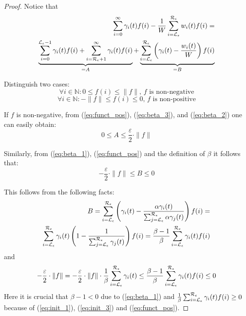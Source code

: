 \documentclass{entcs}
\begin{document}
{\begin{proof}
		Notice that
		\begin{eqnarray}
			\sum_{i=0}^{\infty} \gamma_{i}(t) f(i) - \frac{1}{W}\sum_{i = \mathcal{L}_{\epsilon}}^{\mathcal{R}_{\epsilon}} w_{i}(t) f(i) = \nonumber \\
			\underbrace{\sum_{i = 0}^{\mathcal{L}_{\epsilon}-1} \gamma_{i}(t) f(i) + \sum_{i = \mathcal{R}_{\epsilon}+1}^{\infty} \gamma_{i}(t) f(i)}_{ = A} +  
			\underbrace{\sum_{i = \mathcal{L}_{\epsilon}}^{\mathcal{R}_{\epsilon}} \left( \gamma_{i}(t) - \frac{w_{i}(t)}{W} \right) f(i)}_{ = B} \nonumber
		\end{eqnarray}
		
		Distinguish two cases:
		\begin{equation}
			\forall i \in \mathbb{N} : 0 \leq f(i) \leq \|f\| \text{, $f$ is non-negative} \label{eq:funct_pos}
		\end{equation}
		\begin{equation}
			\forall i \in \mathbb{N} : -\|f\| \leq f(i) \leq 0 \text{, $f$ is non-positive} \label{eq:funct_neg}
		\end{equation}
		
		If $f$ is non-negative, from (\ref{eq:funct_pos}), (\ref{eq:beta_3}), and (\ref{eq:beta_2}) one can easily obtain:
		\begin{equation}
			0 \leq A \leq \frac{\varepsilon}{2} \cdot \|f\|
			\label{eq:fg_A_pos}
		\end{equation}
		
		Similarly, from (\ref{eq:beta_1}), (\ref{eq:funct_pos}) and the definition of $\beta$ it follows that:
		\begin{equation}
			- \frac{\varepsilon}{2} \cdot \|f\| \leq B \leq 0
			\label{eq:fg_B_pos}
		\end{equation}
		
		This follows from the following facts:
		\begin{eqnarray}
			B = \sum_{i = \mathcal{L}_{\epsilon}}^{\mathcal{R}_{\epsilon}} \left( \gamma_{i}(t) - \frac{\alpha \gamma_{i}(t) }{\sum^{\mathcal{R}_{\epsilon}}_{j=\mathcal{L}_{\epsilon}} \alpha \gamma_{j}(t)} \right) f(i) = \nonumber \\
			\sum_{i = \mathcal{L}_{\epsilon}}^{\mathcal{R}_{\epsilon}} \gamma_{i}(t) \left( 1 - \frac{1}{\sum^{\mathcal{R}_{\epsilon}}_{j=\mathcal{L}_{\epsilon}} \gamma_{j}(t)} \right) f(i) = \frac{\beta - 1}{\beta} \sum_{i = \mathcal{L}_{\epsilon}}^{\mathcal{R}_{\epsilon}} \gamma_{i}(t)  f(i)\nonumber
		\end{eqnarray}
		and
		\[
			- \frac{\varepsilon}{2} \cdot \|f\| = - \frac{\varepsilon}{2} \cdot \|f\|\cdot \frac{1}{\beta} \sum_{i = \mathcal{L}_{\epsilon}}^{\mathcal{R}_{\epsilon}} \gamma_{i}(t) \leq \frac{\beta - 1}{\beta} \sum_{i = \mathcal{L}_{\epsilon}}^{\mathcal{R}_{\epsilon}} \gamma_{i}(t)  f(i) \leq 0
		\]  
		Here it is crucial that $\beta - 1 < 0$ due to (\ref{eq:beta_1}) and $\frac{1}{\beta} \sum_{i = \mathcal{L}_{\epsilon}}^{\mathcal{R}_{\epsilon}} \gamma_{i}(t)  f(i) \geq 0$ because of (\ref{eq:init_1}), (\ref{eq:init_3}) and  (\ref{eq:funct_pos}).
		

\end{proof}}
\end{document}
